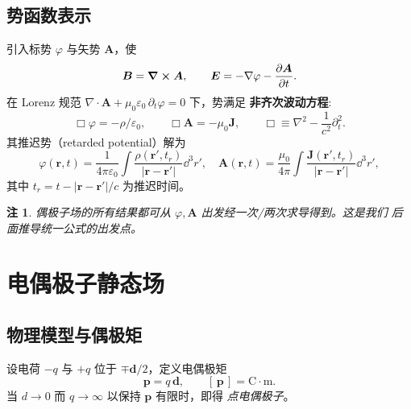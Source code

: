 \documentclass[11pt,a4paper]{article}
\newcommand{\epso}{\varepsilon_{0}}
\newcommand{\muo}{\mu_{0}}
\newcommand{\pvec}{\bm p}
\newcommand{\Evec}{\bm E}
\newcommand{\Bvec}{\bm B}
\newcommand{\Avec}{\bm A}
\newcommand{\Jvec}{\bm J}
\newcommand{\rvec}{\bm r}
\newcommand{\diver}{\nabla\cdot}
\newtheorem{remark}{注}
\begin{document}
\subsection{势函数表示}
引入标势 $\varphi$ 与矢势 $\Avec$，使
\begin{equation}
    \Bvec=\curl\Avec,\qquad \Evec=-\nabla\varphi-\pdv{\Avec}{t}.
\end{equation}
在 Lorenz 规范 $\diver\Avec + \muo\epso\,\partial_t\varphi=0$ 下，势满足
\textbf{非齐次波动方程}:
\begin{equation}
    \Box\varphi=-\rho/\epso,\qquad \Box\Avec=-\muo\Jvec,
    \qquad \Box\equiv\nabla^{2}-\frac{1}{c^{2}}\partial_{t}^{2}.
\end{equation}
其推迟势（retarded potential）解为
\begin{equation}
    \varphi(\rvec,t)=\frac{1}{4\pi\epso}\int\frac{\rho(\rvec',t_r)}{|\rvec-\rvec'|}\dd^{3}r',
    \quad
    \Avec(\rvec,t)=\frac{\muo}{4\pi}\int\frac{\Jvec(\rvec',t_r)}{|\rvec-\rvec'|}\dd^{3}r',
\end{equation}
其中 $t_r = t-|\rvec-\rvec'|/c$ 为推迟时间。

\begin{remark}
偶极子场的所有结果都可从 $\varphi,\Avec$ 出发经一次/两次求导得到。这是我们
后面推导统一公式的出发点。
\end{remark}

\section{电偶极子静态场}

\subsection{物理模型与偶极矩}
设电荷 $-q$ 与 $+q$ 位于 $\mp\bm d/2$，定义电偶极矩
\begin{equation}
    \pvec = q\,\bm d, \qquad [\,\pvec\,]=\mathrm{C\!\cdot\!m}.
\end{equation}
当 $d\to 0$ 而 $q\to\infty$ 以保持 $\pvec$ 有限时，即得 \emph{点电偶极子}。
\end{document}
